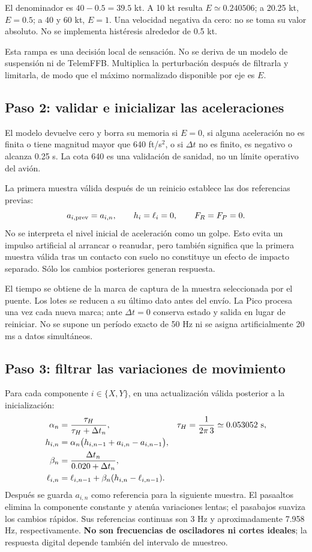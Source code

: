 \documentclass[11pt,a4paper]{article}
\begin{document}
El denominador es $40-0.5=39.5$ kt. A 10 kt resulta $E\simeq0.240506$; a 20.25 kt, $E=0.5$; a 40 y 60 kt, $E=1$. Una velocidad negativa da cero: no se toma su valor absoluto. No se implementa histéresis alrededor de 0.5 kt.

Esta rampa es una decisión local de sensación. No se deriva de un modelo de suspensión ni de TelemFFB. Multiplica la perturbación después de filtrarla y limitarla, de modo que el máximo normalizado disponible por eje es $E$.

\subsection{Paso 2: validar e inicializar las aceleraciones}
El modelo devuelve cero y borra su memoria si $E=0$, si alguna aceleración no es finita o tiene magnitud mayor que 640 ft/s$^2$, o si $\Delta t$ no es finito, es negativo o alcanza 0.25 s. La cota 640 es una validación de sanidad, no un límite operativo del avión.

La primera muestra válida después de un reinicio establece las dos referencias previas:
\begin{equation}
a_{i,\rm prev}=a_{i,n},\qquad h_i=\ell_i=0,\qquad F_R=F_P=0.
\end{equation}
No se interpreta el nivel inicial de aceleración como un golpe. Esto evita un impulso artificial al arrancar o reanudar, pero también significa que la primera muestra válida tras un contacto con suelo no constituye un efecto de impacto separado. Sólo los cambios posteriores generan respuesta.

El tiempo se obtiene de la marca de captura de la muestra seleccionada por el puente. Los lotes se reducen a su último dato antes del envío. La Pico procesa una vez cada nueva marca; ante $\Delta t=0$ conserva estado y salida en lugar de reiniciar. No se supone un período exacto de 50 Hz ni se asigna artificialmente 20 ms a datos simultáneos.

\subsection{Paso 3: filtrar las variaciones de movimiento}
Para cada componente $i\in\{X,Y\}$, en una actualización válida posterior a la inicialización:
\begin{align}
\alpha_n&=\frac{\tau_H}{\tau_H+\Delta t_n}, & \tau_H&=\frac{1}{2\pi\,3}\simeq0.053052\ {\rm s},\\
h_{i,n}&=\alpha_n\bigl(h_{i,n-1}+a_{i,n}-a_{i,n-1}\bigr),\\
\beta_n&=\frac{\Delta t_n}{0.020+\Delta t_n},\\
\ell_{i,n}&=\ell_{i,n-1}+\beta_n(h_{i,n}-\ell_{i,n-1}).
\label{eq:ground-filter}
\end{align}
Después se guarda $a_{i,n}$ como referencia para la siguiente muestra. El pasaaltos elimina la componente constante y atenúa variaciones lentas; el pasabajos suaviza los cambios rápidos. Sus referencias continuas son 3 Hz y aproximadamente 7.958 Hz, respectivamente. \textbf{No son frecuencias de osciladores ni cortes ideales}; la respuesta digital depende también del intervalo de muestreo.
\end{document}
